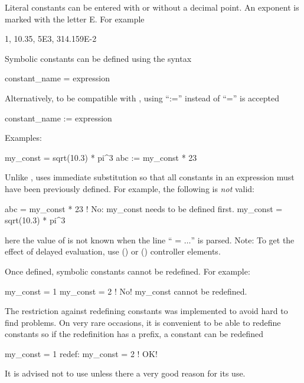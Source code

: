 {{{{{
Literal constants can be entered with or without a decimal point. An
exponent is marked with the letter E. For example
\begin{example}
  1, 10.35, 5E3, 314.159E-2
\end{example}
Symbolic constants can be defined using the syntax
\begin{example}
  constant_name = expression
\end{example}
Alternatively, to be compatible with \mad, using ``:='' instead of ``='' is accepted
\begin{example}
  constant_name := expression
\end{example}
Examples:
\begin{example}
  my_const = sqrt(10.3) * pi^3
  abc     := my_const * 23
\end{example}
Unlike \mad, \bmad uses immediate substitution so that all constants in an expression must have been
previously defined. For example, the following is {\em not} valid:
\begin{example}
  abc      = my_const * 23      ! No: my_const needs to be defined first.
  my_const = sqrt(10.3) * pi^3
\end{example}
here the value of  is not known when the line `` = $\ldots$'' is parsed. Note:
To get the effect of delayed evaluation, use  () or 
() controller elements.

Once defined, symbolic constants cannot be redefined. For example:
\begin{example}
  my_const = 1
  my_const = 2  ! No! my_const cannot be redefined.
\end{example}
The restriction against redefining constants was implemented to avoid hard to find problems.
On very rare occasions, it is convenient to be able to redefine constants so if the redefinition
has a  prefix, a constant can be redefined
\begin{example}
  my_const = 1
  redef: my_const = 2  ! OK!
\end{example}
It is advised not to use  unless there a very good reason for its use.

}}}}}
